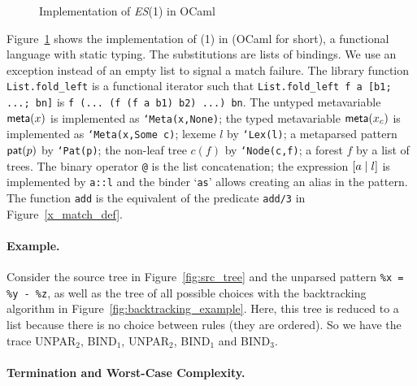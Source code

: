 \begin{figure}
\caption{Implementation of \textit{ES}(1) in \textsf{OCaml}
\label{es1_match_ocaml}}
\end{figure}

Figure~\ref{es1_match_ocaml} shows the implementation of (1)
in \OCaml (\textsf{OCaml} for short), a functional language with
static typing. The substitutions are lists of bindings. We use an
exception instead of an empty list to signal a match failure. The
library function \texttt{List.fold\_left} is a functional iterator
such that \texttt{List.fold\_left f a [b1; ...; bn]} is \texttt{f
  (... (f (f a b1) b2) ...) bn}. The untyped meta\-variable
\(\textsf{meta}(x)\) is implemented as \texttt{`Meta(x,None)}; the typed
meta\-variable \(\textsf{meta}(x_{c})\) is implemented as \texttt{`Meta(x,Some
  c)}; lexeme \(l\) by \texttt{`Lex(l)}; a meta\-parsed pattern
\(\textsf{pat}(p)\) by \texttt{`Pat(p)}; the non\hyp{}leaf tree \(c(f)\) by
\texttt{`Node(c,f)}; a forest \(f\) by a list of trees. The binary
operator \texttt{@} is the list concatenation; the expression
\([{a}\mid{l}]\) is implemented by \texttt{a::l} and the binder
`\texttt{as}' allows creating an alias in the \OCaml pattern. The
function \texttt{add} is the equivalent of the \Prolog predicate
\texttt{add/3} in Figure~\ref{x_match_def}.

\paragraph{Example.}

Consider the source tree in Figure~\ref{fig:src_tree} and the unparsed
pattern \texttt{\%x = \%y - \%z}, as well as the tree of all possible
choices with the backtracking algorithm in
Figure~\ref{fig:backtracking_example}. Here, this tree is reduced to a
list because there is no choice between rules (they are ordered). So
we have the trace \textsf{UNPAR}\(_2\), \textsf{BIND}\(_1\),
\textsf{UNPAR}\(_2\), \textsf{BIND}\(_1\) and \textsf{BIND}\(_3\).

\paragraph{Termination and Worst\hyp{}Case Complexity.}

